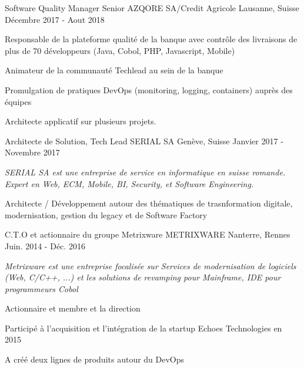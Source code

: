 \begin{cventries}
{}%
\cventry
{Software Quality Manager Senior} %
{AZQORE SA/Credit Agricole} %
{Lausanne, Suisse} %
{Décembre 2017 - Aout 2018} %
{
    \begin{cvitems} %
        \item {Responsable de la plateforme qualité de la banque avec contrôle des livraisons de plus de 70 développeurs (Java, Cobol, PHP, Javascript, Mobile)}
        \item {Animateur de la communauté Techlead au sein de la banque}        
        \item {Promulgation de pratiques DevOps (monitoring, logging, containers) auprès des équipes}        
        \item {Architecte applicatif sur plusieurs projets.}                
    \end{cvitems}
}%
\cventry
{Architecte de Solution, Tech Lead} %
{SERIAL SA} %
{Genève, Suisse} %
{Janvier 2017 - Novembre 2017 } %
{
	\begin{cvitems} %
		\item {\textit{SERIAL SA est une entreprise de service en informatique en suisse romande. Expert en Web, ECM, Mobile, BI, Security, et Software Engineering.}}
		\item {Architecte / Développement autour des thématiques de trasnformation digitale, modernisation, gestion du legacy et de Software Factory}
	\end{cvitems}
}
  \cventry
    {C.T.O et actionnaire du groupe Metrixware} %
    {METRIXWARE} %
    {Nanterre, Rennes} %
    {Juin. 2014 - Déc. 2016} %
    {
      \begin{cvitems} %
        \item {\textit{Metrixware est une entreprise focalisée sur Services de modernisation de logiciels (Web, C/C++, ...) et les solutions de revamping pour Mainframe, IDE pour programmeurs Cobol}}
        \item {Actionnaire et membre et la direction}
        \item {Participé à l'acquisition et l'intégration de la startup Echoes Technologies en 2015}
        \item {A créé deux lignes de produits autour du DevOps}

\end{cvitems}}
\end{cventries}
